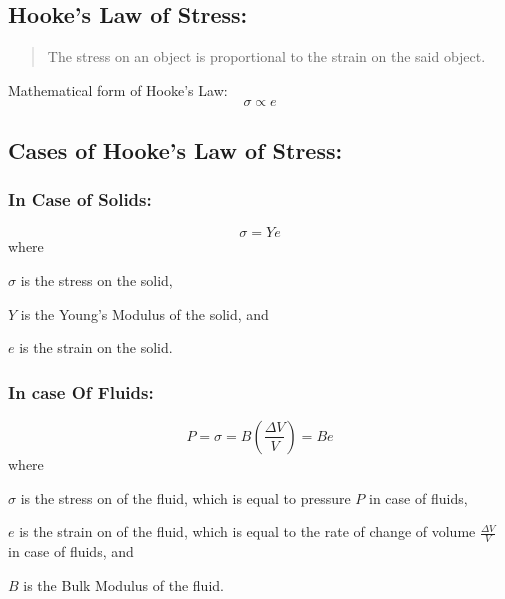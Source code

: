 \documentclass[a4paper]{report}
\begin{document}
        \subsection{Hooke's Law of Stress: }
            \begin{quotation}
                The stress on an object is proportional to the strain on the said object.
            \end{quotation}
            Mathematical form of Hooke's Law: 
            \begin{equation}
                \sigma \propto e
            \end{equation}
        \subsection{Cases of Hooke's Law of Stress: }
            \subsubsection{In Case of Solids: }
                \begin{equation}
                    \sigma = Ye
                \end{equation}
                where
                \begin{description}
                    \item $\sigma$ is the stress on the solid,
                    \item $Y$ is the Young's Modulus of the solid, and
                    \item $e$ is the strain on the solid.
                \end{description}
            \subsubsection{In case Of Fluids: }
                \begin{equation}
                    P = \sigma = B (\frac{\Delta V}{V}) = B e
                \end{equation}
                where
                \begin{description}
                    \item $\sigma$ is the stress on of the fluid, which is equal to pressure $P$ in case of fluids,
                    \item $e$ is the strain on of the fluid, which is equal to the rate of change of volume $\frac{\Delta V}{V}$  in case of fluids, and
                    \item $B$ is the Bulk Modulus of the fluid.
                \end{description}
        
\end{document}
